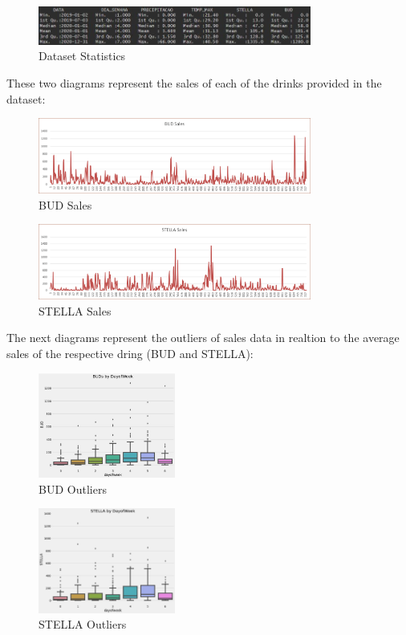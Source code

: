 \begin{figure}[H]
    \centering
    \includegraphics[width=0.8\textwidth]{assets/dataset-stats.jpeg}
    \caption{Dataset Statistics}
    \label{fig:dataset_stats}
    \end{figure}

These  two diagrams represent the sales of each of the drinks provided in the dataset:
\\
\begin{figure}[H]
    \centering
    \includegraphics[width=0.8\textwidth]{assets/BUD.png}
    \caption{BUD Sales}
    \label{fig:bud_sales}
    \end{figure}

\begin{figure}[H]
    \centering
    \includegraphics[width=0.8\textwidth]{assets/stella.png}
    \caption{STELLA Sales}
    \label{fig:stella_sales}
    \end{figure}

The next diagrams represent the outliers of sales data in realtion to the average sales of the respective dring (BUD and STELLA):\\

\begin{figure}[H]
    \centering
    \includegraphics[width=0.4\textwidth]{assets/BUD-OUTLIERS.jpeg}
    \caption{BUD Outliers}
    \label{fig:bud_outliers}
    \end{figure}

\begin{figure}[H]
    \centering
    \includegraphics[width=0.4\textwidth]{assets/stella-outliers.jpeg}
    \caption{STELLA Outliers}
    \label{fig:stella_outliers}
    \end{figure}
